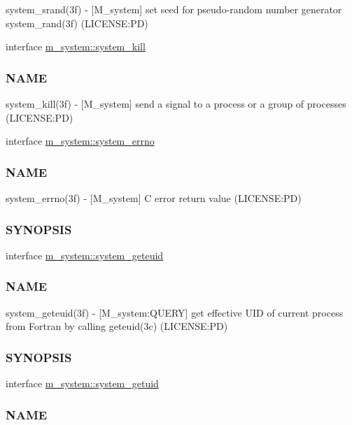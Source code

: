 \begin{DoxyCompactItemize}
\begin{DoxyCompactList}
system\+\_\+srand(3f) -\/ \mbox{[}M\+\_\+system\mbox{]} set seed for pseudo-\/random number generator system\+\_\+rand(3f) (L\+I\+C\+E\+N\+SE\+:PD) \end{DoxyCompactList}\item 
interface \mbox{\hyperlink{interfacem__system_1_1system__kill}{m\+\_\+system\+::system\+\_\+kill}}
\begin{DoxyCompactList}\small\item\em \subsubsection*{N\+A\+ME}

system\+\_\+kill(3f) -\/ \mbox{[}M\+\_\+system\mbox{]} send a signal to a process or a group of processes (L\+I\+C\+E\+N\+SE\+:PD) \end{DoxyCompactList}\item 
interface \mbox{\hyperlink{interfacem__system_1_1system__errno}{m\+\_\+system\+::system\+\_\+errno}}
\begin{DoxyCompactList}\small\item\em \subsubsection*{N\+A\+ME}

system\+\_\+errno(3f) -\/ \mbox{[}M\+\_\+system\mbox{]} C error return value (L\+I\+C\+E\+N\+SE\+:PD) \subsubsection*{S\+Y\+N\+O\+P\+S\+IS}\end{DoxyCompactList}\item 
interface \mbox{\hyperlink{interfacem__system_1_1system__geteuid}{m\+\_\+system\+::system\+\_\+geteuid}}
\begin{DoxyCompactList}\small\item\em \subsubsection*{N\+A\+ME}

system\+\_\+geteuid(3f) -\/ \mbox{[}M\+\_\+system\+:Q\+U\+E\+RY\mbox{]} get effective U\+ID of current process from Fortran by calling geteuid(3c) (L\+I\+C\+E\+N\+SE\+:PD) \subsubsection*{S\+Y\+N\+O\+P\+S\+IS}\end{DoxyCompactList}\item 
interface \mbox{\hyperlink{interfacem__system_1_1system__getuid}{m\+\_\+system\+::system\+\_\+getuid}}
\begin{DoxyCompactList}\small\item\em \subsubsection*{N\+A\+ME}


\end{DoxyCompactList}
\end{DoxyCompactItemize}
